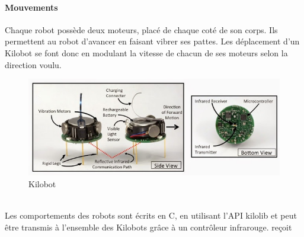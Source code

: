 \documentclass[a4paper]{article}
\begin{document}
\paragraph{Mouvements}Chaque robot possède deux moteurs, placé de chaque coté de son corps. Ils permettent au robot d'avancer en faisant vibrer ses pattes. Les déplacement d'un Kilobot se font donc en modulant la vitesse de chacun de ses moteurs selon la direction voulu.\\
\begin{figure}[h]
	\begin{center}
		\centering
		\includegraphics[width=0.8\linewidth]{incl/kilobot-closeup-overview.jpg}
		\caption{Kilobot}
	\end{center}
\end{figure} \\
Les comportements des robots sont écrits en C, en utilisant l'API kilolib et peut être transmis à l'ensemble des Kilobots  grâce à un contrôleur infrarouge.
reçoit
\end{document}
